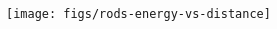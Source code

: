 \documentclass[landscape,a0paper,final,showframe]{baposter}
\begin{document}
\begin{poster}
{\begin{multicols}{2}
\begin{center}
      \end{center}
      \begin{center}
        \texttt{[image: figs/rods-energy-vs-distance]}
      \end{center}
    \end{multicols}
  }%
\end{poster}%
%
\end{document}
